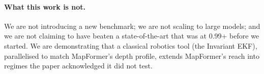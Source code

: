 \paragraph{What this work is not.} We are not introducing a new benchmark;
we are not scaling to large models; and we are not claiming to have beaten
a state-of-the-art that was at 0.99+ before we started. We are demonstrating
that a classical robotics tool (the Invariant EKF), parallelised to match
MapFormer's depth profile, extends MapFormer's reach into regimes the paper
acknowledged it did not test.
